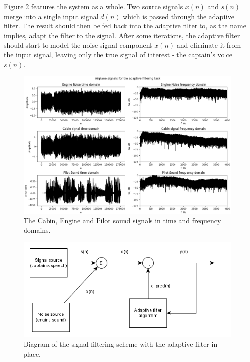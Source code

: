 \documentclass[10pt,a4paper,twocolumn]{article}
\begin{document}
Figure \ref{f2} features the system as a whole. Two source signals $x(n)$ and $s(n)$ merge into a single input signal $d(n)$ which is passed through the adaptive filter. The result should then be fed back into the adaptive filter to, as the name implies, adapt the filter to the signal. After some iterations, the adaptive filter should start to model the noise signal component $x(n)$ and eliminate it from the input signal, leaving only the true signal of interest - the captain's voice $s(n)$.

\begin{figure} %
	[!h]
	\centering
	\includegraphics*[width=.8\columnwidth]{f1.png} %
	\caption{The Cabin, Engine and Pilot sound signals in time and frequency domains.}
	\label{f1}
	\vspace{6pt}
\end{figure}


\begin{figure} %
	[!h]
	\centering
	\includegraphics*[width=.8\columnwidth]{f2.png} %
	\caption{Diagram of the signal filtering scheme with the adaptive filter in place.}
	\label{f2}
	\vspace{6pt}
\end{figure}
\end{document}
